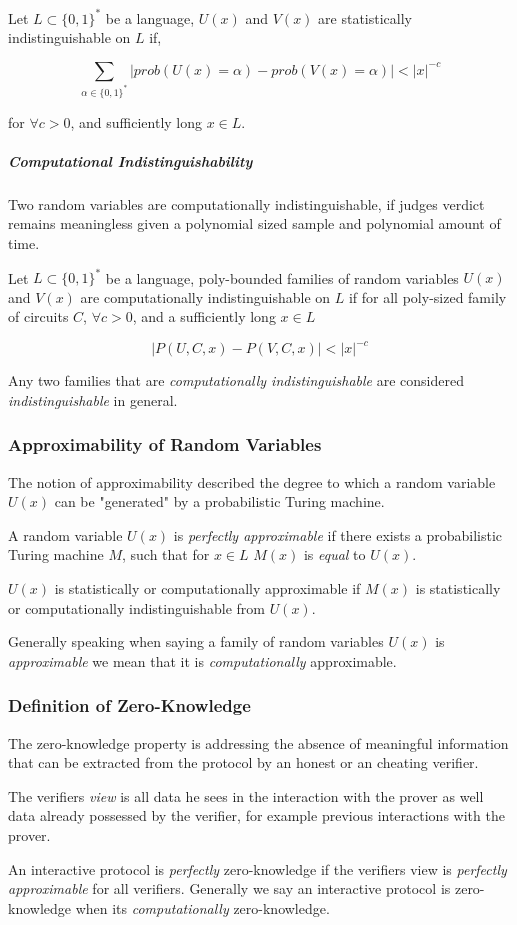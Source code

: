 Let $L \subset \{0,1\}^*$ be a language, $U(x)$ and $V(x)$ are statistically indistinguishable on $L$ if,

$$\sum_{\alpha \in \{0,1\}^*} |prob(U(x) = \alpha) - prob(V(x) = \alpha) | < |x|^{-c}$$

for $\forall c > 0$, and sufficiently long $x \in L$. 

\subparagraph{Computational Indistinguishability}

Two random variables are computationally indistinguishable, if judges verdict remains meaningless given a polynomial sized sample and polynomial amount of time.

\bigskip

Let $L \subset \{0,1\}^*$ be a language, poly-bounded families of random variables $U(x)$ and $V(x)$ are computationally indistinguishable on $L$ if for all poly-sized family of circuits $C$, $\forall c > 0$, and a sufficiently long $x \in L$

$$|P(U, C, x) - P(V, C, x)| < |x|^{-c}$$

Any two families that are \textit{computationally indistinguishable} are considered  \textit{indistinguishable} in general.

\subsubsection{Approximability of Random Variables}

The notion of approximability described the degree to which a random variable $U(x)$ can be "generated" by a probabilistic Turing machine.

\bigskip

A random variable $U(x)$ is \textit{perfectly approximable} if there exists a probabilistic Turing machine $M$, such that for $x \in L$ $M(x)$ is \textit{equal} to $U(x)$.

$U(x)$ is statistically or computationally approximable if $M(x)$ is statistically or computationally indistinguishable from $U(x)$.

\bigskip

Generally speaking when saying a family of random variables $U(x)$ is \textit{approximable} we mean that it is \textit{computationally} approximable.

\subsubsection{Definition of Zero-Knowledge}

The zero-knowledge property is addressing the absence of meaningful information that can be extracted from the protocol by an honest or an cheating verifier.


The verifiers \textit{view} is all data he sees in the interaction with the prover as well data already possessed by the verifier, for example previous interactions with the prover.

\bigskip

An interactive protocol is \textit{perfectly} zero-knowledge if the verifiers view is \textit{perfectly approximable} for all verifiers. Generally we say an interactive protocol is zero-knowledge when its \textit{computationally} zero-knowledge.